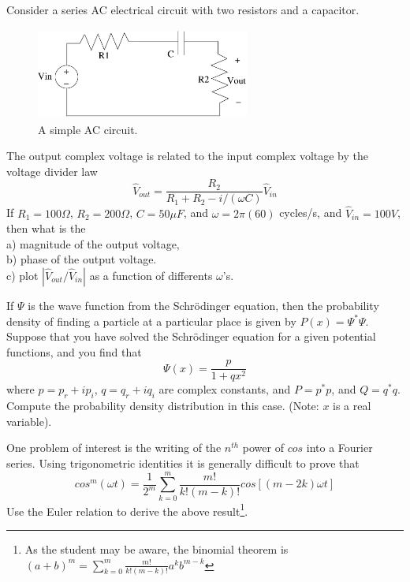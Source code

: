 \begin{problems}
Consider a series AC electrical circuit with two resistors
and a capacitor.
\begin{figure}[h]
\begin{center}
\includegraphics[width=7cm,height=3cm]{images/RRC1.eps}
\caption[RC Circuit]{A simple AC circuit.}
\end{center}
\end{figure}
The output complex voltage is related to the input complex voltage by 
the voltage divider law
\[
{\hat{V}}_{out} = \frac{R_2}{R_1 + R_2 -i/(\omega C)} {\hat{V}}_{in}
\]
If $R_1 = 100 \Omega $, $R_2= 200 \Omega $, $C = 50 {\mu}F$, and 
$\omega = 2 \pi (60)$ cycles/s, and ${\hat{V}}_{in} = 100 V$, 
then what is the \\

a)      magnitude of the output voltage,\\
b)      phase of the output voltage.\\
c)      plot $| {\hat{V}}_{out} / {\hat{V}}_{in} |$ as a function 
of differents $\omega$'s.
\end{problems}

\begin{problems}
If $\Psi$ is the wave function from the Schr\"{o}dinger equation, then
the probability density of finding a particle at a particular
place is given by $P(x) = \Psi ^* \Psi$.  Suppose that you
have solved the Schr\"{o}dinger equation for a given potential
functions, and you find that
\[
\Psi (x) = \frac{p}{1+qx^2}
\]
where $p=p_r +i p_i$, $q=q_r + iq_i$ are complex constants, and
$P=p^*p$, and $Q=q^*q$.
Compute the probability density distribution in this case.
(Note: $x$ is a real variable).
\end{problems}


\begin{problems}
One problem of interest is the writing of
the $n^{th}$ power of $cos$ into a Fourier series.
Using trigonometric identities it is generally difficult to
prove that
\[
cos^m(\omega t) = \frac{1}{2^m}
\sum_{k=0}^m \frac{m!}{k!(m-k)!} cos[(m-2k) \omega t]
\]
Use the Euler relation to derive the above result\footnote {As the
student may be aware, the
binomial theorem is $(a+b)^m = \sum_{k=0}^m \frac{m!}{k!(m-k)!} 
a^k b^{m-k}$}.
\end{problems}

